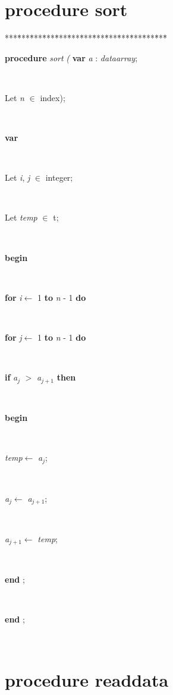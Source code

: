 \documentclass[10pt, a4paper]{article}
\begin{document}
\section{procedure sort}\label{sec:./SORTFsort}

\begin{tabbing}
***\=***\=***\=***\=***\=***\=***\=***\=***\=***\=***\=***\=***\=\kill
\parbox{14cm}{\textsf {\textbf {procedure } \textsf{ \textit{sort} \textit{(} 	} \textbf{ var } \textsf{\textit{a} : \textit{dataarray}}; }}\\
\parbox{14cm}{\textsf{Let \textit{n} $\in$ index);}}\\
\+\parbox{14cm}{\textsf{\textbf{var} }}\\
\parbox{14cm}{\textsf{Let \textit{i}, \textit{j} $\in$ integer;}}\\
\parbox{14cm}{\textsf{Let \textit{temp} $\in$ t;}}\\
\-\<\+\parbox{14cm}{\textsf{\textbf{begin} }}\\
\+\parbox{14cm}{\textsf {\textbf {for } \textsf{\textit{i}$\leftarrow$ 1} \textbf{ to } \textsf{\textit{n} - 1} \textbf{ do } }}\\
\+\parbox{14cm}{\textsf {\textbf {for } \textsf{\textit{j}$\leftarrow$ 1} \textbf{ to } \textsf{\textit{n} - 1} \textbf{ do } }}\\
\+\parbox{14cm}{\textsf {\textbf {if } \textsf{\textit{a}$_{\textit{j}}$ $>$ \textit{a}$_{\textit{j} + 1}$} \textbf{ then } }}\\
\<\parbox{14cm}{\textsf{\textbf{begin} }}\\
\parbox{14cm}{\textsf{\textit{temp}$\leftarrow$ \textit{a}$_{\textit{j}}$}; }\\
\parbox{14cm}{\textsf{\textit{a}$_{\textit{j}}$$\leftarrow$ \textit{a}$_{\textit{j} + 1}$}; }\\
\parbox{14cm}{\textsf{\textit{a}$_{\textit{j} + 1}$$\leftarrow$ \textit{temp}}; }\\
\<\-\parbox{14cm}{\textsf{\textbf{end} ;}}\\
\<\-\<\-\<\-\parbox{14cm}{\textsf{\textbf{end} ;}}\\
\end{tabbing}
\section{procedure readdata}\label{sec:./SORTFreaddata}
\end{document}

